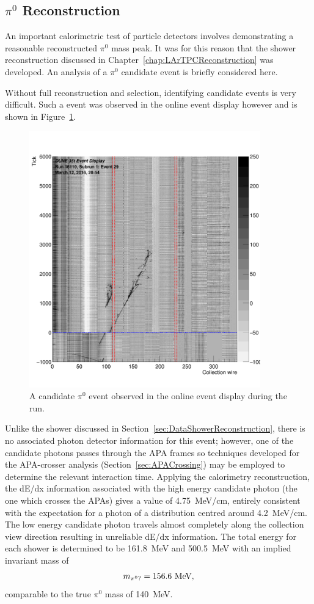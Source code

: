 \subsection{$\pi^0$ Reconstruction}\label{sec:DataPi0Reconstruction}

An important calorimetric test of particle detectors involves demonstrating a reasonable reconstructed $\pi^0$ mass peak.  It was for this reason that the shower reconstruction discussed in Chapter~\ref{chap:LArTPCReconstruction} was developed.  An analysis of a $\pi^0$ candidate event is briefly considered here.

Without full reconstruction and selection, identifying candidate events is very difficult.  Such a event was observed in the online event display however and is shown in Figure~\ref{fig:DataPi0Candidate}.
\begin{figure}[htb]
  \centering
  \includegraphics[width=10cm]{evd_run16110_subrun1_event29.png}
  \caption{A candidate $\pi^0$ event observed in the online event display during the run.}
  \label{fig:DataPi0Candidate}
\end{figure}
Unlike the shower discussed in Section~\ref{sec:DataShowerReconstruction}, there is no associated photon detector information for this event; however, one of the candidate photons passes through the APA frames so techniques developed for the APA-crosser analysis (Section~\ref{sec:APACrossing}) may be employed to determine the relevant interaction time.  Applying the calorimetry reconstruction, the dE/dx information associated with the high energy candidate photon (the one which crosses the APAs) gives a value of 4.75~MeV/cm, entirely consistent with the expectation for a photon of a distribution centred around 4.2~MeV/cm.  The low energy candidate photon travels almost completely along the collection view direction resulting in unreliable dE/dx information.  The total energy for each shower is determined to be 161.8~MeV and 500.5~MeV with an implied invariant mass of
\begin{equation}\label{eq:DataPi0CandidateMass}
m_{\pi^0?} = 156.6~\textnormal{MeV},
\end{equation}
comparable to the true $\pi^0$ mass of 140~MeV.

